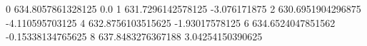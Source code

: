 0 634.8057861328125 0.0
1 631.7296142578125 -3.076171875
2 630.6951904296875 -4.110595703125
4 632.8756103515625 -1.93017578125
6 634.6524047851562 -0.15338134765625
8 637.8483276367188 3.04254150390625
